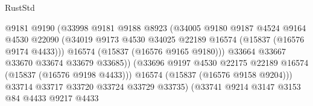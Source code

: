 \begin{lexlean}{RustStd}
\begin{coremodule}
{\begin{coremodule}
{{{{{{{{{{{{{{{{{{{{{{{{{{{{{{{{{{{{{{{{{{{{{{{{{{{{{{{{{{{{                                          @9181
                                          @9190
                                          (@33998
                                            @9181
                                            @9188
                                            @8923
                                            (@34005
                                              @9180
                                              @9187
                                              @4524
                                              @9164
                                              @4530
                                              @22090
                                              (@34019
                                                @9173
                                                @4530
                                                @34025
                                                @22189
                                                @16574
                                                (@15837 (@16576 @9174 @4433)))
                                              @16574
                                              (@15837 (@16576 @9165 @9180)))
                                            @33664
                                            @33667
                                            @33670
                                            @33674
                                            @33679
                                            @33685))
                                        (@33696
                                          @9197
                                          @4530
                                          @22175
                                          @22189
                                          @16574
                                          (@15837 (@16576 @9198 @4433)))
                                        @16574
                                        (@15837 (@16576 @9158 @9204)))
                                      @33714
                                      @33717
                                      @33720
                                      @33724
                                      @33729
                                      @33735)
                                    (@33741
                                      @9214
                                      @3147
                                      @3153
                                      @84
                                      @4433
                                      @9217
                                      @4433
}}}}}}}}}}}}}}}}}}}}}}}}}}}}}}}}}}}}}}}}}}}}}}}}}}}}}}}}}}}}
\end{coremodule}}
\end{coremodule}
\end{lexlean}
